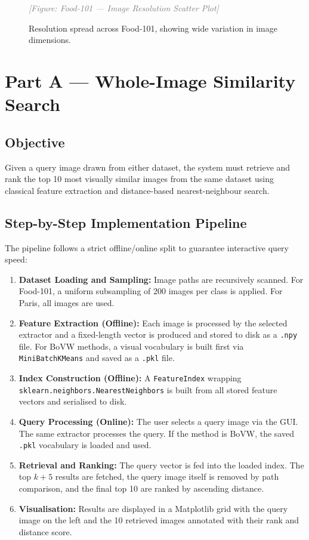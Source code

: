 \documentclass[11pt, a4paper]{article}
\newcommand{\imagebox}[2]{%
  \begin{mdframed}[backgroundcolor=gray!15, linecolor=gray!50, linewidth=1pt]
    \centering
    \vspace{#2}
    \textcolor{gray}{\textit{[Figure: #1]}}
    \vspace{#2}
  \end{mdframed}
}
\begin{document}
\begin{figure}[H]
  \centering
  \imagebox{Food-101 — Image Resolution Scatter Plot}{1.8cm}
  \caption{Resolution spread across Food-101, showing wide variation in image dimensions.}
  \label{fig:food_resolution}
\end{figure}

\newpage
\section{Part A — Whole-Image Similarity Search}

\subsection{Objective}
Given a query image drawn from either dataset, the system must retrieve and rank the top 10 most visually similar images from the same dataset using classical feature extraction and distance-based nearest-neighbour search.

\subsection{Step-by-Step Implementation Pipeline}
The pipeline follows a strict offline/online split to guarantee interactive query speed:
\begin{enumerate}
  \item \textbf{Dataset Loading and Sampling:} Image paths are recursively scanned. For Food-101, a uniform subsampling of 200 images per class is applied. For Paris, all images are used.
  \item \textbf{Feature Extraction (Offline):} Each image is processed by the selected extractor and a fixed-length vector is produced and stored to disk as a \texttt{.npy} file. For BoVW methods, a visual vocabulary is built first via \texttt{MiniBatchKMeans} and saved as a \texttt{.pkl} file.
  \item \textbf{Index Construction (Offline):} A \texttt{FeatureIndex} wrapping \texttt{sklearn.neighbors.NearestNeighbors} is built from all stored feature vectors and serialised to disk.
  \item \textbf{Query Processing (Online):} The user selects a query image via the GUI. The same extractor processes the query. If the method is BoVW, the saved \texttt{.pkl} vocabulary is loaded and used.
  \item \textbf{Retrieval and Ranking:} The query vector is fed into the loaded index. The top $k{+}5$ results are fetched, the query image itself is removed by path comparison, and the final top 10 are ranked by ascending distance.
  \item \textbf{Visualisation:} Results are displayed in a Matplotlib grid with the query image on the left and the 10 retrieved images annotated with their rank and distance score.
\end{enumerate}
\end{document}
